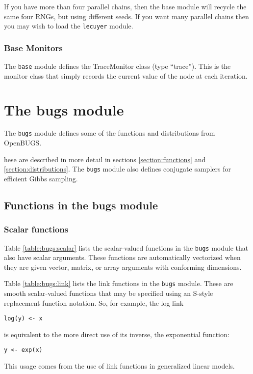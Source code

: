 \documentclass[11pt, a4paper, titlepage]{report}
\newcommand{\OpenBUGS}{\textsf{OpenBUGS}}
\begin{document}
If you have more than four parallel chains, then the base module will
recycle the same four RNGs, but using different seeds. If you want
many parallel chains then you may wish to load the \verb+lecuyer+
module.

\subsection{Base Monitors}

The \verb+base+ module defines the TraceMonitor class (type
``trace''). This is the monitor class that simply records the current
value of the node at each iteration.

\chapter{The bugs module}
\label{section:bugs}

The \verb+bugs+ module defines some of the functions and distributions
from \OpenBUGS.


hese are described in more detail in sections
\ref{section:functions} and \ref{section:distributions}.  The
\verb+bugs+ module also defines conjugate samplers for efficient Gibbs
sampling.

\section{Functions in the bugs module}
\label{section:bugs:functions}

\subsection{Scalar functions}

Table \ref{table:bugs:scalar} lists the scalar-valued functions in the
\texttt{bugs} module that also have scalar arguments.  These functions
are automatically vectorized when they are given vector, matrix, or
array arguments with conforming dimensions.

Table \ref{table:bugs:link} lists the link functions in the
\texttt{bugs} module.  These are smooth scalar-valued functions that
may be specified using an S-style replacement function notation. So,
for example, the log link
\begin{verbatim}
log(y) <- x
\end{verbatim}
is equivalent to the more direct use of its inverse, the exponential
function:
\begin{verbatim}
y <- exp(x)
\end{verbatim}
This usage comes from the use of link functions in generalized linear
models.
\end{document}
